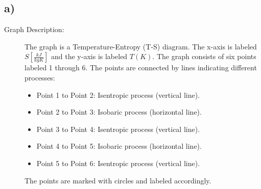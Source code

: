 

\subsection*{a)}

\begin{description}
    \item[Graph Description:] The graph is a Temperature-Entropy (T-S) diagram. The x-axis is labeled $S \left[ \frac{kJ}{kgK} \right]$ and the y-axis is labeled $T (K)$. The graph consists of six points labeled 1 through 6. The points are connected by lines indicating different processes:
    \begin{itemize}
        \item Point 1 to Point 2: Isentropic process (vertical line).
        \item Point 2 to Point 3: Isobaric process (horizontal line).
        \item Point 3 to Point 4: Isentropic process (vertical line).
        \item Point 4 to Point 5: Isobaric process (horizontal line).
        \item Point 5 to Point 6: Isentropic process (vertical line).
    \end{itemize}
    The points are marked with circles and labeled accordingly.
\end{description}